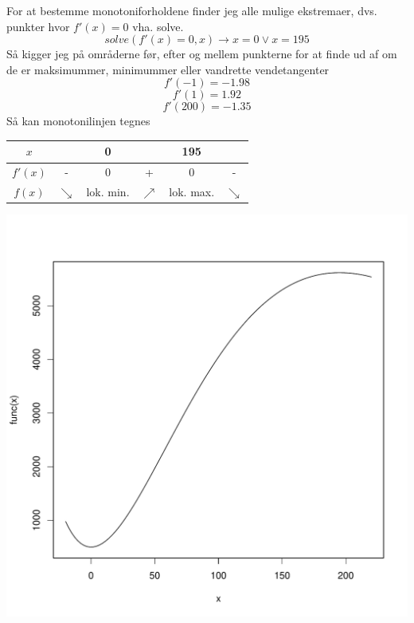 \documentclass[12pt]{article}
\begin{document}
\begin{enumerate}
                For at bestemme monotoniforholdene finder jeg alle mulige
                ekstremaer, dvs. punkter hvor $f'(x) = 0$ vha. solve.
                $$solve(f'(x) = 0,x) \rightarrow x = 0 \vee x = 195$$
                Så kigger jeg på områderne før, efter og mellem punkterne for
                at finde ud af om de er maksimummer, minimummer eller
                vandrette vendetangenter
                $$f'(-1) = -1.98$$
                $$f'(1) = 1.92$$
                $$f'(200) = -1.35$$
                Så kan monotonilinjen tegnes
                \begin{center}
                        \begin{tabular}{c | c c c c c}
                                $x$ & & 0 & & 195 & \\ \hline
                                $f'(x)$ & - & 0 & + & 0 & - \\
                                $f(x)$ & $\searrow$ & lok. min. & $\nearrow$ & lok. max. & $\searrow$ \\
                        \end{tabular}
                \end{center}
                \includegraphics[width=\textwidth]{dia/10b.pdf}

\end{enumerate}
\end{document}
